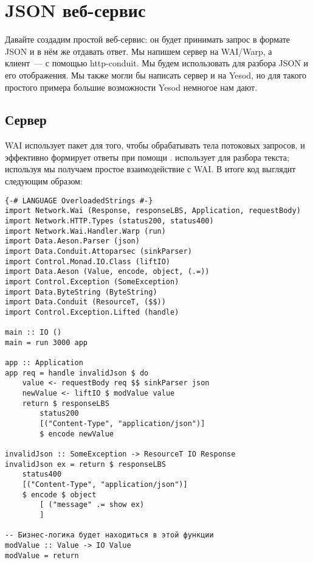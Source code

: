 \chapter {JSON веб-сервис}\label{chap:json_web_service}

Давайте создадим простой веб-сервис: он будет принимать запрос в формате JSON и в нём же отдавать ответ. Мы напишем сервер на WAI/Warp, а клиент~--- с помощью {http-conduit}. Мы будем использовать  для разбора JSON и его отображения. Мы также могли бы написать сервер и на Yesod, но для такого простого примера большие возможности Yesod немногое нам дают.

\section {Сервер}

WAI использует пакет  для того, чтобы обрабатывать тела потоковых запросов, и эффективно формирует ответы при помощи .  использует  для разбора текста; используя  мы получаем простое взаимодействие с WAI. В итоге код выглядит следующим образом:

\begin{lstlisting}
{-# LANGUAGE OverloadedStrings #-}
import Network.Wai (Response, responseLBS, Application, requestBody)
import Network.HTTP.Types (status200, status400)
import Network.Wai.Handler.Warp (run)
import Data.Aeson.Parser (json)
import Data.Conduit.Attoparsec (sinkParser)
import Control.Monad.IO.Class (liftIO)
import Data.Aeson (Value, encode, object, (.=))
import Control.Exception (SomeException)
import Data.ByteString (ByteString)
import Data.Conduit (ResourceT, ($$))
import Control.Exception.Lifted (handle)

main :: IO ()
main = run 3000 app

app :: Application
app req = handle invalidJson $ do
    value <- requestBody req $$ sinkParser json
    newValue <- liftIO $ modValue value
    return $ responseLBS
        status200
        [("Content-Type", "application/json")]
        $ encode newValue

invalidJson :: SomeException -> ResourceT IO Response
invalidJson ex = return $ responseLBS
    status400
    [("Content-Type", "application/json")]
    $ encode $ object
        [ ("message" .= show ex)
        ]

-- Бизнес-логика будет находиться в этой функции
modValue :: Value -> IO Value
modValue = return
\end{lstlisting}%

